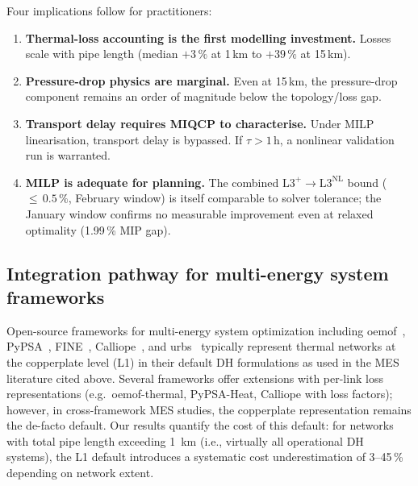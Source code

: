 \documentclass[a4paper,fleqn]{cas-dc}
\newcommand{\Lplus}{\mathrm{L3}^{+}}
\newcommand{\Lnl}{\mathrm{L3}^{\mathrm{NL}}}
\begin{document}
Four implications follow for practitioners:
%
\begin{enumerate}[nosep]
  \item \textbf{Thermal-loss accounting is the first modelling
        investment.} Losses scale with pipe length (median
        $+3\,\%$ at 1\,km to $+39\,\%$ at 15\,km).
  \item \textbf{Pressure-drop physics are marginal.} Even at
        15\,km, the pressure-drop component remains an order of
        magnitude below the topology/loss gap.
  \item \textbf{Transport delay requires MIQCP to characterise.}
        Under MILP linearisation, transport delay is bypassed. If
        $\tau > 1$\,h, a nonlinear validation run is warranted.
  \item \textbf{MILP is adequate for planning.} The combined
        $\Lplus\!\to\!\Lnl$ bound (${\leq}\,0.5\,\%$, February
        window) is itself comparable to solver tolerance; the
        January window confirms no measurable improvement even at
        relaxed optimality (1.99\,\% MIP gap).
\end{enumerate}

\subsection{Integration pathway for multi-energy system frameworks}
\label{sec:disc_tools}

Open-source frameworks for multi-energy system optimization
including oemof~\citep{Hilpert2018_oemof},
PyPSA~\citep{Brown2018_pypsa}, FINE~\citep{Welder2018_FINE},
Calliope~\citep{Pfenninger2018_calliope}, and
urbs~\citep{Dorfner2016_urbs} typically represent thermal
networks at the copperplate level (L1) in their default
DH formulations as used in the MES literature cited above.
Several frameworks offer extensions with per-link loss
representations (e.g.\ oemof-thermal, PyPSA-Heat, Calliope with loss factors); however, in
cross-framework MES studies, the copperplate representation
remains the de-facto default. Our results quantify the cost of
this default: for networks with total pipe length exceeding
\SI{1}{\kilo\metre} (i.e., virtually all operational DH systems),
the L1 default introduces a systematic cost underestimation of
3--45\,\% depending on network extent.
\end{document}
